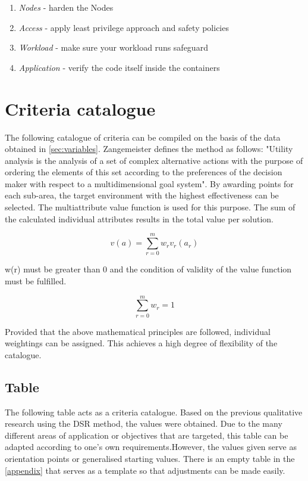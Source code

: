 \documentclass[MSC,Master,english]{twbook}%
\begin{document}
\begin{enumerate}
    \item \textit{Nodes} - harden the Nodes
    \item \textit{Access} - apply least privilege approach and safety policies
    \item \textit{Workload} - make sure your workload runs safeguard
    \item \textit{Application} - verify the code itself inside the containers
\end{enumerate}



\section{Criteria catalogue}
\label{sec:cc}
The following catalogue of criteria can be compiled on the basis of the data obtained in \autoref{sec:variables}. Zangemeister defines the method as follows: "Utility analysis is the analysis of a set of complex alternative actions with the purpose of ordering the elements of this set according to the preferences of the decision maker with respect to a multidimensional goal system"\cite{nwa}. By awarding points for each sub-area, the target environment with the highest effectiveness can be selected. The multiattribute value function is used for this purpose. The sum of the calculated individual attributes results in the total value per solution.

\begin{equation*}
v(a) = \sum \limits_{r=0}^{m}w_{r} v_{r} (a_{r})
\end{equation*}

w(r) must be greater than 0 and the condition of validity of the value function must be fulfilled.

\begin{equation*}
\sum \limits_{r=0}^{m} w_{r} = 1
\end{equation*}

Provided that the above mathematical principles are followed, individual weightings can be assigned. This achieves a high degree of flexibility of the catalogue. 

\subsection{Table}
The following table acts as a criteria catalogue. Based on the previous qualitative research using the \ac{DSR} method, the values were obtained. Due to the many different areas of application or objectives that are targeted, this table can be adapted according to one's own requirements.However, the values given serve as orientation points or generalised starting values. There is an empty table in the \autoref{appendix} that serves as a template so that adjustments can be made easily.
\end{document}
